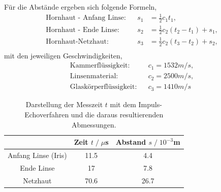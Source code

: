 Für die Abstände ergeben sich folgende Formeln,
\begin{align*}
    \textrm{Hornhaut - Anfang Linse}:& &s_1&=\frac{1}{2}c_1t_1,\\
    \textrm{Hornhaut - Ende Linse}:& &s_2&=\frac{1}{2}c_2(t_2-t_1)+s_1,\\
    \textrm{Hornhaut-Netzhaut}:& &s_3&=\frac{1}{2}c_2(t_3-t_2)+s_2,\\
\end{align*}
mit den jeweiligen Geschwindigkeiten,
\begin{align*}
    \text{Kammerflüssigkeit}: & &c_1=1532 m/s,\\
    \text{Linsenmaterial}: & &c_2=2500 m/s,\\
    \text{Glaskörperflüssigkeit}: & &c_3=1410 m/s
\end{align*}
\begin{table}
    \centering
    \begin{tabular}{c| c c}
        \toprule
        & Zeit $t\;/\;\mu$s&Abstand $s\;/\;10^{-3}$m\\
        \midrule
        Anfang Linse (Iris) &11.5& 4.4\\
        Ende Linse &17& 7.8\\
        Netzhaut &70.6& 26.7\\
        \bottomrule
    \end{tabular}
    \caption{Darstellung der Messzeit $t$ mit dem Impuls-Echoverfahren und die daraus
    resultierenden Abmessungen.}
\end{table}
\label{sec:Auswertung}
